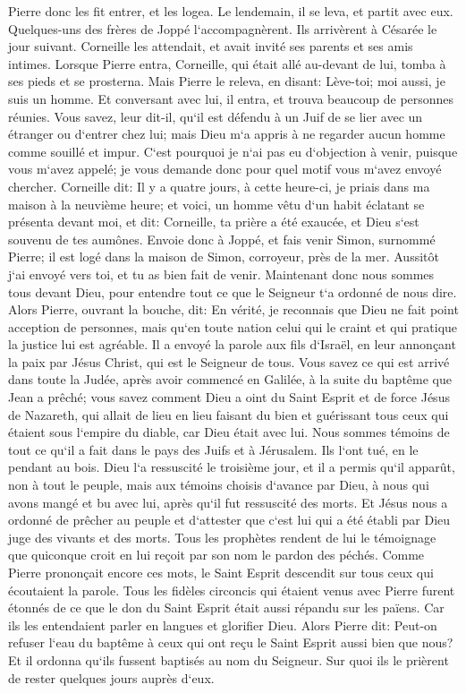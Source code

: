 \verse Pierre donc les fit entrer, et les logea. Le lendemain, il se leva, et partit avec eux. Quelques-uns des frères de Joppé l`accompagnèrent. 
\verse Ils arrivèrent à Césarée le jour suivant. Corneille les attendait, et avait invité ses parents et ses amis intimes. 
\verse Lorsque Pierre entra, Corneille, qui était allé au-devant de lui, tomba à ses pieds et se prosterna. 
\verse Mais Pierre le releva, en disant: Lève-toi; moi aussi, je suis un homme. 
\verse Et conversant avec lui, il entra, et trouva beaucoup de personnes réunies. 
\verse Vous savez, leur dit-il, qu`il est défendu à un Juif de se lier avec un étranger ou d`entrer chez lui; mais Dieu m`a appris à ne regarder aucun homme comme souillé et impur. 
\verse C`est pourquoi je n`ai pas eu d`objection à venir, puisque vous m`avez appelé; je vous demande donc pour quel motif vous m`avez envoyé chercher. 
\verse Corneille dit: Il y a quatre jours, à cette heure-ci, je priais dans ma maison à la neuvième heure; et voici, un homme vêtu d`un habit éclatant se présenta devant moi, et dit: 
\verse Corneille, ta prière a été exaucée, et Dieu s`est souvenu de tes aumônes. 
\verse Envoie donc à Joppé, et fais venir Simon, surnommé Pierre; il est logé dans la maison de Simon, corroyeur, près de la mer. 
\verse Aussitôt j`ai envoyé vers toi, et tu as bien fait de venir. Maintenant donc nous sommes tous devant Dieu, pour entendre tout ce que le Seigneur t`a ordonné de nous dire. 
\verse Alors Pierre, ouvrant la bouche, dit: En vérité, je reconnais que Dieu ne fait point acception de personnes, 
\verse mais qu`en toute nation celui qui le craint et qui pratique la justice lui est agréable. 
\verse Il a envoyé la parole aux fils d`Israël, en leur annonçant la paix par Jésus Christ, qui est le Seigneur de tous. 
\verse Vous savez ce qui est arrivé dans toute la Judée, après avoir commencé en Galilée, à la suite du baptême que Jean a prêché; 
\verse vous savez comment Dieu a oint du Saint Esprit et de force Jésus de Nazareth, qui allait de lieu en lieu faisant du bien et guérissant tous ceux qui étaient sous l`empire du diable, car Dieu était avec lui. 
\verse Nous sommes témoins de tout ce qu`il a fait dans le pays des Juifs et à Jérusalem. Ils l`ont tué, en le pendant au bois. 
\verse Dieu l`a ressuscité le troisième jour, et il a permis qu`il apparût, 
\verse non à tout le peuple, mais aux témoins choisis d`avance par Dieu, à nous qui avons mangé et bu avec lui, après qu`il fut ressuscité des morts. 
\verse Et Jésus nous a ordonné de prêcher au peuple et d`attester que c`est lui qui a été établi par Dieu juge des vivants et des morts. 
\verse Tous les prophètes rendent de lui le témoignage que quiconque croit en lui reçoit par son nom le pardon des péchés. 
\verse Comme Pierre prononçait encore ces mots, le Saint Esprit descendit sur tous ceux qui écoutaient la parole. 
\verse Tous les fidèles circoncis qui étaient venus avec Pierre furent étonnés de ce que le don du Saint Esprit était aussi répandu sur les païens. 
\verse Car ils les entendaient parler en langues et glorifier Dieu. 
\verse Alors Pierre dit: Peut-on refuser l`eau du baptême à ceux qui ont reçu le Saint Esprit aussi bien que nous? 
\verse Et il ordonna qu`ils fussent baptisés au nom du Seigneur. Sur quoi ils le prièrent de rester quelques jours auprès d`eux. 

